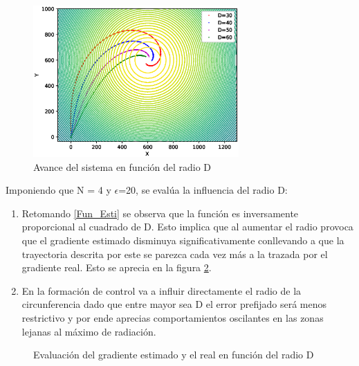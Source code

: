 \begin{figure}[H]
\centering
\includegraphics[width=0.70\textwidth]{figures/Dif_R_BU/Figure_1.eps}
\caption{Avance del sistema en función del radio D} \label{D_Var}
\end{figure}

Imponiendo que N = 4 y $\epsilon$=20, se evalúa la influencia del radio D:

\begin{enumerate}
	\item Retomando \ref{Fun_Esti} se observa que la función es inversamente proporcional al cuadrado de D. Esto implica que al aumentar el radio provoca que el gradiente estimado disminuya significativamente conllevando a que la trayectoria descrita por este se parezca cada vez más a la trazada por el gradiente real. Esto se aprecia en la figura \ref{Gradiente_Var_D}.
	\item En la formación de control va a influir directamente el radio de la circunferencia dado que entre mayor sea D el error prefijado será menos restrictivo y por ende aprecias comportamientos oscilantes en las zonas lejanas al máximo de radiación.
\end{enumerate}

\begin{figure}[H]
  \begin{center}
    \caption{Evaluación del gradiente estimado y el real en función del radio D}
    \label{Gradiente_Var_D}
  \end{center}
\end{figure}


